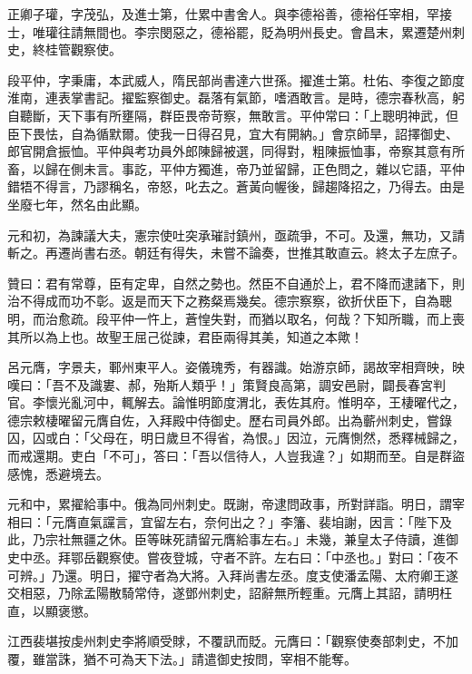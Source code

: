 \begin{pinyinscope}
 正卿子瓘，字茂弘，及進士第，仕累中書舍人。與李德裕善，德裕任宰相，罕接士，唯瓘往請無間也。李宗閔惡之，德裕罷，貶為明州長史。會昌末，累遷楚州刺史，終桂管觀察使。



 段平仲，字秉庸，本武威人，隋民部尚書達六世孫。擢進士第。杜佑、李復之節度淮南，連表掌書記。擢監察御史。磊落有氣節，嗜酒敢言。是時，德宗春秋高，躬自聽斷，天下事有所壅隔，群臣畏帝苛察，無敢言。平仲常曰：「上聰明神武，但臣下畏怯，自為循默爾。使我一日得召見，宜大有開納。」會京師旱，詔擇御史、郎官開倉振恤。平仲與考功員外郎陳歸被選，同得對，粗陳振恤事，帝察其意有所畜，以歸在側未言。事訖，平仲方獨進，帝乃並留歸，正色問之，雜以它語，平仲錯牾不得言，乃謬稱名，帝怒，叱去之。蒼黃向幄後，歸趨降招之，乃得去。由是坐廢七年，然名由此顯。



 元和初，為諫議大夫，憲宗使吐突承璀討鎮州，亟疏爭，不可。及還，無功，又請斬之。再遷尚書右丞。朝廷有得失，未嘗不論奏，世推其敢直云。終太子左庶子。



 贊曰：君有常尊，臣有定卑，自然之勢也。然臣不自通於上，君不降而逮諸下，則治不得成而功不彰。返是而天下之務粲焉幾矣。德宗察察，欲折伏臣下，自為聰明，而治愈疏。段平仲一忤上，蒼惶失對，而猶以取名，何哉？下知所職，而上喪其所以為上也。故聖王屈己從諫，君臣兩得其美，知道之本歟！



 呂元膺，字景夫，鄆州東平人。姿儀瑰秀，有器識。始游京師，謁故宰相齊映，映嘆曰：「吾不及識婁、郝，殆斯人類乎！」策賢良高第，調安邑尉，闢長春宮判官。李懷光亂河中，輒解去。論惟明節度渭北，表佐其府。惟明卒，王棲曜代之，德宗敕棲曜留元膺自佐，入拜殿中侍御史。歷右司員外郎。出為蘄州刺史，嘗錄囚，囚或白：「父母在，明日歲旦不得省，為恨。」因泣，元膺惻然，悉釋械歸之，而戒還期。吏白「不可」，答曰：「吾以信待人，人豈我違？」如期而至。自是群盜感愧，悉避境去。



 元和中，累擢給事中。俄為同州刺史。既謝，帝逮問政事，所對詳詣。明日，謂宰相曰：「元膺直氣讜言，宜留左右，奈何出之？」李籓、裴垍謝，因言：「陛下及此，乃宗社無疆之休。臣等昧死請留元膺給事左右。」未幾，兼皇太子侍讀，進御史中丞。拜鄂岳觀察使。嘗夜登城，守者不許。左右曰：「中丞也。」對曰：「夜不可辨。」乃還。明日，擢守者為大將。入拜尚書左丞。度支使潘孟陽、太府卿王遂交相惡，乃除孟陽散騎常侍，遂鄧州刺史，詔辭無所輕重。元膺上其詔，請明枉直，以顯褒懲。



 江西裴堪按虔州刺史李將順受賕，不覆訊而貶。元膺曰：「觀察使奏部刺史，不加覆，雖當誅，猶不可為天下法。」請遣御史按問，宰相不能奪。




\end{pinyinscope}

